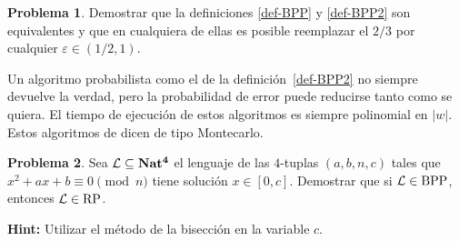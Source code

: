 \documentclass[a4paper, 11pt]{article}
\newcommand{\Lan}{\mathcal{L}}
\newcounter{numerodetema}
\theoremstyle{plain}
\theoremstyle{definition}
\newtheorem{prob}{Problema}[numerodetema]
\begin{document}
\bigskip

\begin{prob}
Demostrar que la definiciones \ref{def-BPP} y \ref{def-BPP2} son equivalentes y que
en cualquiera de ellas es posible reemplazar el $2/3$ por cualquier $\varepsilon
\in(1/2,1)$.
\end{prob}

Un algoritmo probabilista como el de la definición~\ref{def-BPP2} no siempre devuelve
la verdad, pero la probabilidad de error puede reducirse tanto como se quiera. El
tiempo de ejecución de estos algoritmos es siempre polinomial en $|w|$. Estos algoritmos
de dicen de tipo Montecarlo.

\begin{prob}\label{prob-xx}
Sea $\Lan\subseteq{\bf Nat^4}$ el lenguaje de las $4$-tuplas $(a,b,n,c)$ tales que
$x^2+ax+b\equiv0\pmod{n}$ tiene solución $x\in[0,c]$. Demostrar que si $\Lan\in{\rm BPP}$,
entonces $\Lan\in{\rm RP}$.

{\bf Hint:} Utilizar el método de la bisección en la variable $c$.
\end{prob}
\end{document}
